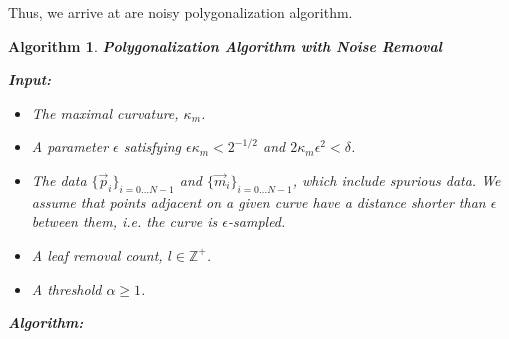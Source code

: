 \documentclass{article}
\newtheorem{algo}{Algorithm}
\numberwithin{cntr}{section}
\numberwithin{equation}{section}
\newcommand{\vp}[0]{{\vec{p}}}
\newcommand{\vm}[0]{{\vec{m}}}
\newcommand{\OtoN}{{0 \ldots N-1}}
\newcommand{\pointData}{{ \{ \vp_{i} \}_{i=\OtoN} }}
\newcommand{\tanData}{{ \{ \vm_{i} \}_{i=\OtoN} }}
\newcommand{\curvemax}{{\kappa_{m}}}
\newcommand{\curvesep}{{\delta}}
\begin{document}
Thus, we arrive at are noisy polygonalization algorithm.

\begin{algo}
  \label{algo:noisyPolygonalization}
  {\bf Polygonalization Algorithm with Noise Removal }

  { \bf Input: }

  \begin{itemize}
  \item The maximal curvature, $\curvemax$.
  \item A parameter $\epsilon$ satisfying $\epsilon \curvemax < 2^{-1/2}$ and $2 \curvemax \epsilon^{2} < \curvesep$.
  \item The data $\pointData$ and $\tanData$, which include spurious data. We assume that points adjacent on a given curve have a distance shorter than $\epsilon$ between them, i.e. the curve is $\epsilon$-sampled.
  \item A leaf removal count, $l \in \mathbb{Z}^{+}$.
  \item A threshold $\alpha \geq 1$.
  \end{itemize}


  {\bf Algorithm: }


\end{algo}
\end{document}
